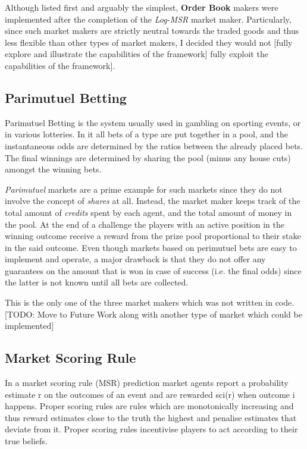 \documentclass[bsc,frontabs,twoside,singlespacing,parskip,deptreport]{infthesis}     %
\begin{document}
	Although listed first and arguably the simplest, {\bf Order Book} makers were implemented after the completion of the {\em Log-MSR} market maker. Particularly, since such market makers are strictly neutral towards the traded goods and thus less flexible than other types of market makers, I decided they would not [fully explore and illustrate the capabilities of the framework] fully exploit the capabilities of the framework]. 

    
\subsection{Parimutuel Betting}
Parimutuel Betting is the system usually used in gambling on sporting events, or in various lotteries. In it all bets of a type are put together in a pool, and the instantaneous odds are determined by the ratios between the already placed bets. The final winnings are determined by sharing the pool (minus any house cuts) amongst the winning bets.

{\em Parimutuel} markets are a prime example for such markets since they do not involve the concept of {\it shares} at all. Instead, the market maker keeps track of the total amount of {\it credits} spent by each agent, and the total amount of money in the pool. At the end of a challenge the players with an active position in the winning outcome receive a reward from the prize pool proportional to their stake in the said outcome.  Even though markets based on perimutuel bets are easy to implement and operate, a major drawback is that they do not offer any guarantees on the amount that is won in case of success (i.e. the final odds) since the latter is not known until all bets are collected. 

This is the only one of the three market makers which was not written in code. 
[TODO: Move to Future Work along with another type of market which could be implemented]

\subsection{Market Scoring Rule}

In a market scoring rule (MSR) prediction market agents report a probability estimate r on the outcomes of an event and are rewarded sci(r) when outcome i happens. Proper scoring rules are rules which are monotonically increasing and thus reward estimates close to the truth the highest and penalise estimates that deviate from it. Proper scoring rules incentivise players to act according to their true beliefs.
\end{document}
